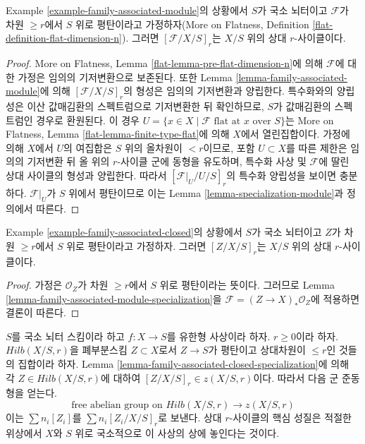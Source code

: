 \begin{lemma}
\label{lemma-family-associated-module-specialization}
Example \ref{example-family-associated-module}의 상황에서 $S$가 국소
뇌터이고 $\mathcal{F}$가 차원 $\geq r$에서 $S$ 위로 평탄이라고
가정하자(More on Flatness, Definition
\ref{flat-definition-flat-dimension-n}). 그러면
$[\mathcal{F}/X/S]_r$는 $X/S$ 위의 상대 $r$-사이클이다.
\end{lemma}

\begin{proof}
More on Flatness, Lemma \ref{flat-lemma-pre-flat-dimension-n}에 의해
$\mathcal{F}$에 대한 가정은 임의의 기저변환으로 보존된다. 또한
Lemma \ref{lemma-family-associated-module}에 의해
$[\mathcal{F}/X/S]_r$의 형성은 임의의 기저변환과 양립한다.
특수화와의 양립성은 이산 값매김환의 스펙트럼으로 기저변환한 뒤
확인하므로, $S$가 값매김환의 스펙트럼인 경우로 환원된다. 이 경우
$U = \{x \in X \mid \mathcal{F}\text{ flat at }x\text{ over }S\}$는
More on Flatness, Lemma \ref{flat-lemma-finite-type-flat}에 의해
$X$에서 열린집합이다. 가정에 의해 $X$에서 $U$의 여집합은 $S$ 위의
올차원이 $< r$이므로, 포함 $U \subset X$를 따른 제한은 임의의
기저변환 뒤 올 위의 $r$-사이클 군에 동형을 유도하며, 특수화 사상
및 $\mathcal{F}$에 딸린 상대 사이클의 형성과 양립한다. 따라서
$[\mathcal{F}|_U / U /S]_r$의 특수화 양립성을 보이면 충분하다.
$\mathcal{F}|_U$가 $S$ 위에서 평탄이므로 이는 Lemma
\ref{lemma-specialization-module}과 정의에서 따른다.
\end{proof}

\begin{lemma}
\label{lemma-family-associated-closed-specialization}
Example \ref{example-family-associated-closed}의 상황에서 $S$가 국소
뇌터이고 $Z$가 차원 $\geq r$에서 $S$ 위로 평탄이라고 가정하자.
그러면 $[Z/X/S]_r$는 $X/S$ 위의 상대 $r$-사이클이다.
\end{lemma}

\begin{proof}
가정은 $\mathcal{O}_Z$가 차원 $\geq r$에서 $S$ 위로 평탄이라는
뜻이다. 그러므로 Lemma \ref{lemma-family-associated-module-specialization}을
$\mathcal{F} = (Z \to X)_*\mathcal{O}_Z$에 적용하면 결론이 따른다.
\end{proof}

\noindent
$S$를 국소 뇌터 스킴이라 하고 $f : X \to S$를 유한형 사상이라
하자. $r \geq 0$이라 하자. $Hilb(X/S, r)$을 폐부분스킴
$Z \subset X$로서 $Z \to S$가 평탄이고 상대차원이 $\leq r$인
것들의 집합이라 하자. Lemma
\ref{lemma-family-associated-closed-specialization}에 의해 각
$Z \in Hilb(X/S, r)$에 대하여 $[Z/X/S]_r \in z(X/S, r)$이다.
따라서 다음 군 준동형을 얻는다.
\begin{equation}
\label{equation-cycle-classes}
\text{free abelian group on }Hilb(X/S, r) \longrightarrow z(X/S, r)
\end{equation}
이는 $\sum n_i[Z_i]$를 $\sum n_i[Z_i/X/S]_r$로 보낸다. 상대
$r$-사이클의 핵심 성질은 적절한 위상에서 $X$와 $S$ 위로 국소적으로
이 사상의 상에 놓인다는 것이다.

